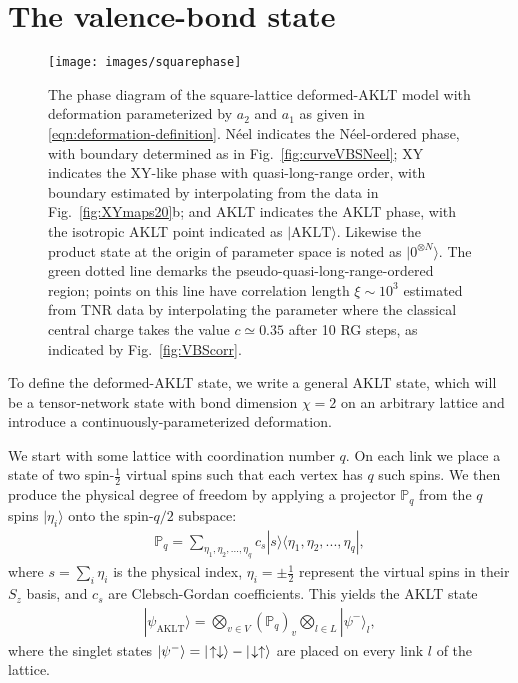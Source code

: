 \documentclass[aps,prb,letterpaper,superscriptaddress,twocolumn,showpacs,floatfix,10pt]{revtex4-1}
\begin{document}
\section{ The valence-bond state  }
\label{sec:state}

\begin{figure}[t]
\texttt{[image: images/squarephase]}
\caption{The phase diagram of the square-lattice deformed-AKLT model with
deformation parameterized by $a_2$ and $a_1$ as given in
\eqref{eqn:deformation-definition}.
N\'eel indicates the N\'eel-ordered phase, with boundary determined as in
Fig.~\ref{fig:curveVBSNeel}; XY indicates the XY-like phase with
quasi-long-range order, with boundary estimated by interpolating from the
data in Fig.~\ref{fig:XYmaps20}b; and AKLT indicates the AKLT phase, with
the isotropic AKLT point indicated as $|\text{AKLT}\rangle$. Likewise the
product state at the origin of parameter space is noted as
$|0^{\otimes N}\rangle$.
The green dotted line demarks the pseudo-quasi-long-range-ordered region;
points on this line have correlation length $\xi \sim 10^3$
estimated from TNR data by interpolating the parameter where the classical
central charge takes the value $c \simeq 0.35$ after 10 RG steps, as indicated
by Fig.~\ref{fig:VBScorr}.
}
\label{fig:squarephase}
\end{figure}

To define the deformed-AKLT state, we write 
a general AKLT state, which will be a tensor-network state 
with bond dimension $\chi=2$ on an arbitrary lattice and introduce a
continuously-parameterized deformation.

We start with some lattice with coordination number $q$. 
On each link we place a state of two spin-$\frac{1}{2}$ virtual spins
such that each vertex has $q$ such spins. We then produce the
physical degree of freedom by applying a projector $\mathbb{P}_q$ from the $q$
spins $|\eta_i \rangle$  onto the spin-$q/2$ subspace:
\begin{align}
\mathbb{P}_q = \sum_{\eta_1, \eta_2,...,\eta_q} c_s|s \rangle \langle \eta_1, \eta_2,...,\eta_q|,
\end{align} 
where $s=\sum_i\eta_i$ is the physical index, $\eta_i=\pm\frac{1}{2}$ represent
the virtual spins in their $S_z$ basis, and $c_s$ are Clebsch-Gordan
coefficients.  This yields the AKLT state
\begin{align}
 |\psi_\text{AKLT} \rangle= \bigotimes_{v\in V}(\mathbb{P}_q)_v  \bigotimes_{l\in L} | \psi^- \rangle_{l}, 
\end{align}
where the singlet states
$| \psi^- \rangle = |\! \uparrow  \downarrow  \rangle - | \! \downarrow  \uparrow  \rangle $
are placed on every link $l$ of the lattice.
\end{document}
